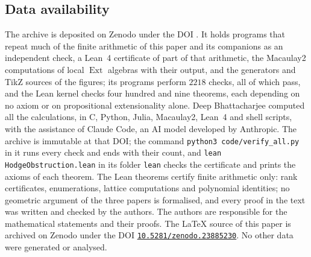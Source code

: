 \documentclass[11pt,reqno]{amsart}
\theoremstyle{plain}
\theoremstyle{definition}
\theoremstyle{remark}
\DeclareMathOperator{\Ext}{Ext}
\begin{document}
\subsection*{Data availability}
The archive \cite{BMB26} is deposited on Zenodo under the DOI
\zenodoCodeDOI. It holds programs that repeat much of the finite arithmetic of this paper and its companions \cite{paperII,paperIII}
as an independent check, a Lean~4 certificate of part of that arithmetic, the
Macaulay2 computations of local $\Ext$ algebras with their output, and the
generators and TikZ sources of the figures; its programs perform $2218$
checks, all of which pass, and the Lean kernel checks four hundred and nine
theorems, each depending on no axiom or on propositional extensionality
alone. Deep Bhattacharjee computed all the calculations, in C, Python, Julia,
Macaulay2, Lean~4 and shell scripts, with the assistance of Claude Code, an
AI model developed by Anthropic. The archive is immutable at that DOI;
the command \texttt{python3 code/verify\_all.py} in it runs every check and
ends with their count, and \texttt{lean HodgeObstruction.lean} in its folder
\texttt{lean} checks the certificate and prints the axioms of each theorem.
The Lean theorems certify finite arithmetic only: rank certificates,
enumerations, lattice computations and polynomial identities; no geometric
argument of the three papers is formalised, and every proof in the text was
written and checked by the authors. The authors are responsible for the
mathematical statements and their proofs. The \LaTeX{} source of this paper is
archived on Zenodo under the DOI \href{https://doi.org/10.5281/zenodo.23885230}{\texttt{10.5281/zenodo.23885230}}.
No other data were generated or analysed.
\end{document}
